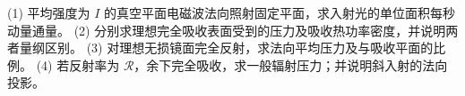 (1) 平均强度为 \(I\) 的真空平面电磁波法向照射固定平面，求入射光的单位面积每秒动量通量。
(2) 分别求理想完全吸收表面受到的压力及吸收热功率密度，并说明两者量纲区别。
(3) 对理想无损镜面完全反射，求法向平均压力及与吸收平面的比例。
(4) 若反射率为 \(\mathcal R\)，余下完全吸收，求一般辐射压力；并说明斜入射的法向投影。
